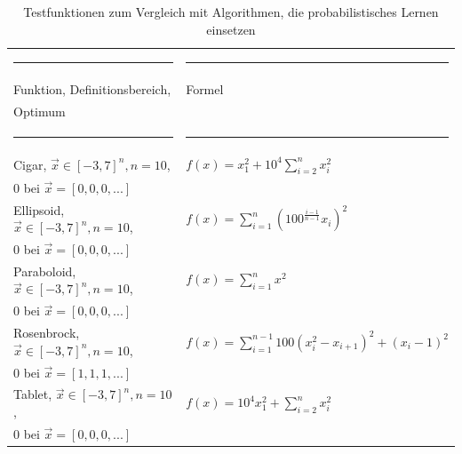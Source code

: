 \documentclass[fontsize=12, a4aper]{scrartcl}
\newcommand\Tstrut{\rule{0pt}{3ex}}           %
\begin{document}
	\begin{table}[H]
		
		\fontsize{10pt}{12pt}
		
		\caption{Testfunktionen zum Vergleich mit Algorithmen, die probabilistisches\hfill\newline
			Lernen einsetzen}
		
		\label{subsec:Stetige_Testfunktionen:tab:Prob_Lernen}
		
		\begin{tabularx}{\textwidth}{l|l}
			
			\rule{6.4cm}{0.4pt} & \rule{8cm}{0.4pt}\\
			
			Funktion, Definitionsbereich, & Formel\\
			Optimum & \\
			
			\rule{6.4cm}{0.4pt} & \rule{8cm}{0.4pt}\\
			
			Cigar, \(\overrightarrow{x} \in [-3,7]^n, n = 10\), & \(f(x)=x_1^2 + 10^4\sum_{i=2}^{n} x_i^2\)\Tstrut\\
			0 bei \(\overrightarrow{x} = [0, 0, 0, ...]\) & \\
			
			Ellipsoid, \(\overrightarrow{x} \in [-3,7]^n, n = 10\), & \(f(x)=\sum_{i=1}^{n} \left(100^\frac{i-1}{n-1} x_i\right)^2\)\Tstrut\\
			0 bei \(\overrightarrow{x} = [0, 0, 0, ...]\) & \\
			
			Paraboloid, \(\overrightarrow{x} \in [-3,7]^n, n = 10\), & \(f(x)=\sum_{i=1}^{n} x^2\)\Tstrut\\
			0 bei \(\overrightarrow{x} = [0, 0, 0, ...]\) & \\
			
			Rosenbrock, \(\overrightarrow{x} \in [-3,7]^n, n = 10\),  & \(f(x)=\sum_{i=1}^{n-1} 100 (x^2_i-x_{i+1})^2 + (x_i-1)^2\) \Tstrut\\
			0 bei \(\overrightarrow{x} = [1, 1, 1, ...]\) & \\
			
			Tablet, \(\overrightarrow{x} \in [-3,7]^n, n = 10\), & \(f(x)=10^4x_1^2 + \sum_{i=2}^{n}x^2_i \)\Tstrut\\
			0 bei \(\overrightarrow{x} = [0, 0, 0, ...]\) &
			
		\end{tabularx}
		
	\end{table}
	
\end{document}

